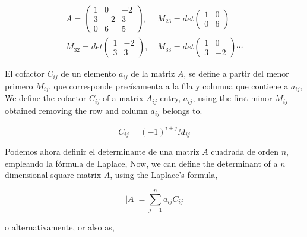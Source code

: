 \begin{align*}
A=\begin{pmatrix}
1& 0& -2\\
3& -2& 3\\
0& 6& 5
\end{pmatrix},& \ 
M_{23}=det
\begin{pmatrix}
1& 0\\
0& 6
\end{pmatrix}\\
M_{32}=
det\begin{pmatrix}
1& -2\\
3& 3
\end{pmatrix},& \ 
M_{33}=
det\begin{pmatrix}
1& 0\\
3& -2
\end{pmatrix}\cdots
\end{align*}

\begin{paracol}{2}
 El  cofactor $C_{ij}$ de un elemento $a_{ij}$ de la matriz $A$, se define a partir del menor primero $M_{ij}$, que corresponde precísamenta a la fila y columna que contiene a $a_{ij}$,
 \switchcolumn
 We define the cofactor $C_{ij}$ of a matrix $A_{ij}$ entry, $a_{ij}$, using the first minor $M_{ij}$ obtained removing the row and column $a_{ij}$ belongs to.
\end{paracol}
 
\begin{equation*}
C_{ij}=(-1)^{i+j} M_{ij}
\end{equation*}

\begin{paracol}{2}
Podemos ahora definir el determinante de una matriz $A$ cuadrada de orden $n$, empleando la fórmula de Laplace,
\switchcolumn
Now, we can define the determinant of a $n$ dimensional square matrix $A$, using the Laplace's formula, 
\end{paracol}
\begin{equation*}
\vert A \vert = \sum_{j=1}^n a_{ij}C_{ij}
\end{equation*}
\begin{paracol}{2}
o alternativamente,
\switchcolumn
or also as,
\end{paracol}

